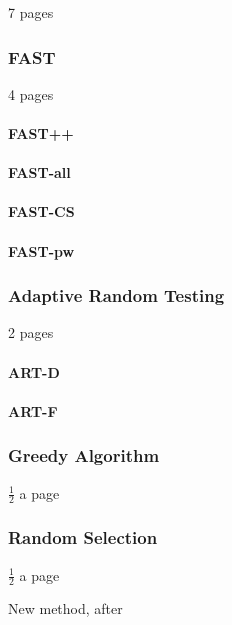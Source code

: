 \documentclass[a4paper,10pt]{article}
\begin{document}
7 pages

\subsubsection{FAST}

4 pages

\paragraph{FAST++}

\paragraph{FAST-all}

\paragraph{FAST-CS}

\paragraph{FAST-pw}

\subsubsection{Adaptive Random Testing}

2 pages

\paragraph{ART-D}

\paragraph{ART-F}

\subsubsection{Greedy Algorithm}

$\frac{1}{2}$ a page

\subsubsection{Random Selection}

$\frac{1}{2}$ a page

New method, after \citealt[p. 17]{khan2018systematic}
\end{document}
